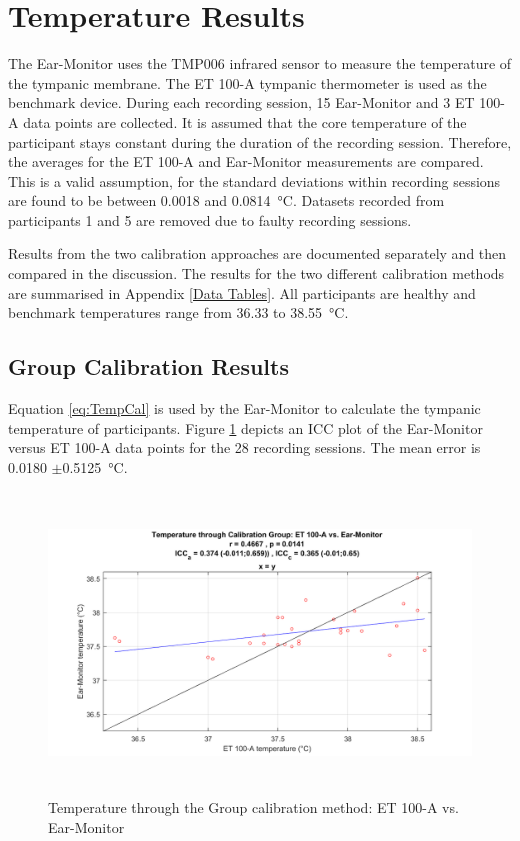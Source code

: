 \section{Temperature Results}
The Ear-Monitor uses the TMP006 infrared sensor to measure the temperature of the tympanic membrane. The ET 100-A tympanic thermometer is used as the benchmark device. During each recording session, 15 Ear-Monitor and 3 ET 100-A data points are collected. It is assumed that the core temperature of the participant stays constant during the duration of the recording session. Therefore, the averages for the ET 100-A and Ear-Monitor measurements are compared. This is a valid assumption, for the standard deviations within recording sessions are found to be between 0.0018 and \SI{0.0814}{\celsius}. Datasets recorded from participants 1 and 5 are removed due to faulty recording sessions.

\medskip

Results from the two calibration approaches are documented separately and then compared in the discussion. The results for the two different calibration methods are summarised in Appendix \ref{Data Tables}. All participants are healthy and benchmark temperatures range from 36.33 to \SI{38.55}{\celsius}.

\subsection{Group Calibration Results}
Equation \ref{eq:TempCal} is used by the Ear-Monitor to calculate the tympanic temperature of participants. Figure \ref{fig:Temp1Scatter} depicts an ICC plot of the Ear-Monitor versus ET 100-A data points for the 28 recording sessions. The mean error is 0.0180 $\pm$\SI{0.5125}{\celsius}.

\begin{figure}[H]
   \centering
   \includegraphics[width=13cm,height=8cm]{figs/Temp1Scatter.png}
   \caption{Temperature through the Group calibration method: ET 100-A vs. Ear-Monitor}
   \label{fig:Temp1Scatter}
\end{figure}


